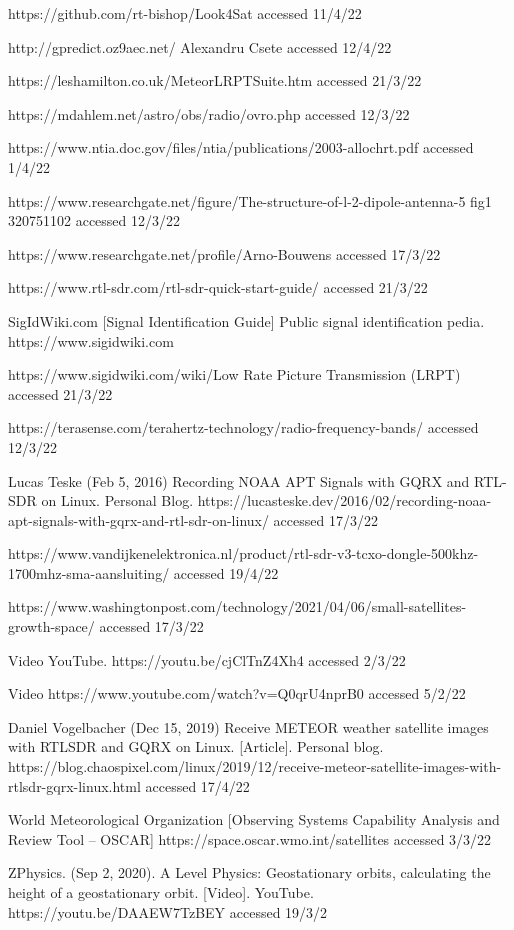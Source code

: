 \documentclass{article}
\begin{document}
\begin{thebibliography}{9}
https://github.com/rt-bishop/Look4Sat accessed 11/4/22

http://gpredict.oz9aec.net/ Alexandru Csete accessed 12/4/22

https://leshamilton.co.uk/MeteorLRPTSuite.htm  accessed 21/3/22

https://mdahlem.net/astro/obs/radio/ovro.php  accessed 12/3/22

https://www.ntia.doc.gov/files/ntia/publications/2003-allochrt.pdf accessed 1/4/22

https://www.researchgate.net/figure/The-structure-of-l-2-dipole-antenna-5 fig1 320751102  accessed 12/3/22

https://www.researchgate.net/profile/Arno-Bouwens  accessed 17/3/22

https://www.rtl-sdr.com/rtl-sdr-quick-start-guide/  accessed 21/3/22

SigIdWiki.com [Signal Identification Guide] Public signal identification pedia. https://www.sigidwiki.com

https://www.sigidwiki.com/wiki/Low Rate Picture Transmission (LRPT) accessed 21/3/22

https://terasense.com/terahertz-technology/radio-frequency-bands/  accessed 12/3/22

Lucas Teske (Feb 5, 2016) Recording NOAA APT Signals with GQRX and RTL-SDR on Linux. Personal Blog. https://lucasteske.dev/2016/02/recording-noaa-apt-signals-with-gqrx-and-rtl-sdr-on-linux/  accessed 17/3/22

https://www.vandijkenelektronica.nl/product/rtl-sdr-v3-tcxo-dongle-500khz-1700mhz-sma-aansluiting/ accessed 19/4/22

https://www.washingtonpost.com/technology/2021/04/06/small-satellites-growth-space/  accessed 17/3/22

Video YouTube. https://youtu.be/cjClTnZ4Xh4  accessed  2/3/22

Video https://www.youtube.com/watch?v=Q0qrU4nprB0  accessed  5/2/22

Daniel Vogelbacher (Dec 15, 2019) Receive METEOR weather satellite images with RTLSDR and GQRX on Linux. [Article]. Personal blog. https://blog.chaospixel.com/linux/2019/12/receive-meteor-satellite-images-with-rtlsdr-gqrx-linux.html  accessed 17/4/22

World Meteorological Organization [Observing Systems Capability Analysis and Review Tool – OSCAR] https://space.oscar.wmo.int/satellites  accessed 3/3/22

ZPhysics. (Sep 2, 2020). A Level Physics: Geostationary orbits, calculating the height of a geostationary orbit. [Video]. YouTube. https://youtu.be/DAAEW7TzBEY  accessed 19/3/2


\end{thebibliography}
\end{document}
